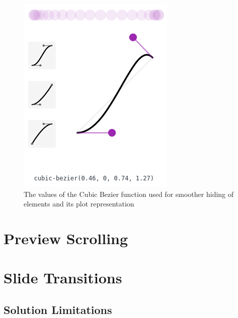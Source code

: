 \begin{figure}[tp]
	\centering
	\includegraphics[width = .4\textwidth]{images/cubic-bezier.png}
	
	\caption[Cubic Bezier Function]{
		The values of the Cubic Bezier function used for smoother hiding of elements and its plot representation
	}
	\label{fig:cubic-bezier}
\end{figure}


\section{Preview Scrolling} %
\label{sec:preview_scrolling}


\section{Slide Transitions} %
\label{sec:slide_transitions}

\subsection{Solution Limitations} %
\label{sub:solution_limitations}


